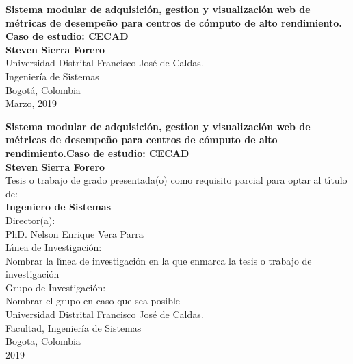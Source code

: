 \begin{center}
\begin{figure}
\centering%
%
\end{figure}
\thispagestyle{empty} \vspace*{2.0cm} \textbf{\large
Sistema modular de adquisici\'{o}n, gestion y visualizaci\'{o}n web de m\'{e}tricas de desempeño para centros de c\'{o}mputo de alto rendimiento.\\ Caso de estudio: CECAD}\\[3.0cm]
\Large\textbf{Steven Sierra Forero}\\[6.0cm]
\small Universidad Distrital Francisco Jos\'{e} de Caldas.\\
Ingenier\'{i}a de Sistemas\\
Bogot\'{a}, Colombia\\
Marzo, 2019\\
\end{center}

\newpage{\pagestyle{empty}\cleardoublepage}

\newpage
\begin{center}
\thispagestyle{empty} \vspace*{0.2cm} \textbf{\large
Sistema modular de adquisici\'{o}n, gestion y visualizaci\'{o}n web de m\'{e}tricas de desempeño para centros de c\'{o}mputo de alto rendimiento.Caso de estudio: CECAD}\\[3.0cm]
\Large\textbf{Steven Sierra Forero}\\[3.0cm]
\small Tesis o trabajo de grado presentada(o) como requisito parcial para optar al
t\'{\i}tulo de:\\
\textbf{Ingeniero de Sistemas}\\[2.5cm]
Director(a):\\
PhD. Nelson Enrique Vera Parra\\[2.0cm]
L\'{\i}nea de Investigaci\'{o}n:\\
Nombrar la l\'{\i}nea de investigaci\'{o}n en la que enmarca la tesis  o trabajo de investigaci\'{o}n\\
Grupo de Investigaci\'{o}n:\\
Nombrar el grupo en caso que sea posible\\[2.5cm]
Universidad Distrital Francisco Jos\'{e} de Caldas.\\
Facultad, Ingenier\'{i}a de Sistemas\\
Bogota, Colombia\\
2019\\
\end{center}

